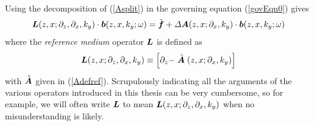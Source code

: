Using the decomposition of (\ref{Asplit}) in the governing equation (\ref{govEqn0}) gives
\begin{equation} \label{Leqn}
{\mbox{\boldmath$\mit L$\unboldmath}}(z,x;{\partial }_{z},{\partial }_{x},{k}_{y})\cdot{\mbox{\boldmath$\mit b$\unboldmath}}(z,x,k_y; \omega) = 
\tilde{\mbox{\boldmath$\mit f$\unboldmath}} + {\mit \Delta} {\mbox{\boldmath$\mit A$\unboldmath}}(z,x;{\partial }_{x},{k}_{y})\cdot{\mbox{\boldmath$\mit b$\unboldmath}}(z,x,k_y; \omega)
\end{equation}
where the {\em reference medium\/} operator ${\mbox{\boldmath$\mit L$\unboldmath}}$ is defined as
\begin{equation} \label{Lref} 
{\mbox{\boldmath$\mit L$\unboldmath}}(z,x;{\partial }_{z},{\partial }_{x},{k}_{y})\equiv
\left[\partial_{z}-\stackrel{\scriptscriptstyle _{\,\,\circ}}{ \mbox{\boldmath$\mit A$\unboldmath}}(z,x;{\partial }_{x},{k}_{y})\right]
\end{equation}
with $\stackrel{\scriptscriptstyle _{\,\,\circ}}{ \mbox{\boldmath$\mit A$\unboldmath}}$ given in (\ref{Adefref}).
Scrupulously indicating all the arguments of the various operators introduced in 
this thesis can be very cumbersome, so for example, we will often write
${\mbox{\boldmath$\mit L$\unboldmath}}$ to mean ${\mbox{\boldmath$\mit L$\unboldmath}}(z,x;{\partial }_{z},{\partial }_{x},{k}_{y})$ when no misunderstanding 
is likely.

